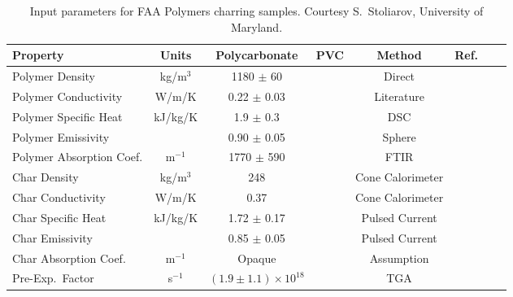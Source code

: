 \begin{table}[h!]
\caption[FAA charring polymer properties.]{Input parameters for FAA Polymers charring samples. Courtesy S.~Stoliarov, University of Maryland.}
\begin{tabular}{|l|c|c|c|c|c|l|l|}
\hline
Property                    & Units         & Polycarbonate                     & PVC                   & Method                &  Ref.                    \\ \hline \hline
Polymer Density             & kg/m$^3$      & 1180 $\pm$ 60                     &                       & Direct                &  \cite{Stoliarov:CF2010}  \\ \hline
Polymer Conductivity        & W/m/K         & 0.22 $\pm$ 0.03                   &                       & Literature            &  \cite{Stoliarov:CF2010}  \\ \hline
Polymer Specific Heat       & kJ/kg/K       & 1.9 $\pm$ 0.3                     &                       & DSC                   &  \cite{Stoliarov:PDS2008}  \\ \hline
Polymer Emissivity          &               & 0.90 $\pm$ 0.05                   &                       & Sphere                &  \cite{Hallman:PES1974}  \\ \hline
Polymer Absorption Coef.    & m$^{-1}$      & 1770 $\pm$ 590                    &                       & FTIR                  &  \cite{Tsilingiris:ECM2003}  \\ \hline
Char Density                & kg/m$^3$      & 248                               &                       & Cone Calorimeter      &  \cite{Stoliarov:CF2010}  \\ \hline
Char Conductivity           & W/m/K         & 0.37                              &                       & Cone Calorimeter      &  \cite{Stoliarov:CF2010}  \\ \hline
Char Specific Heat          & kJ/kg/K       & 1.72 $\pm$ 0.17                   &                       & Pulsed Current        &  \cite{Stoliarov:CF2010,Matsumoto:1996}  \\ \hline
Char Emissivity             &               & 0.85 $\pm$ 0.05                   &                       & Pulsed Current        &  \cite{Stoliarov:CF2010,Matsumoto:1996}  \\ \hline
Char Absorption Coef.       & m$^{-1}$      & Opaque                            &                       & Assumption            &  \cite{Stoliarov:CF2010}  \\ \hline
Pre-Exp.~Factor             & s$^{-1}$      & $(1.9 \pm 1.1) \times 10^{18}$    &                       & TGA                   &  \cite{Stoliarov:CF2010}  \\ \hline

\end{tabular}
\end{table}
